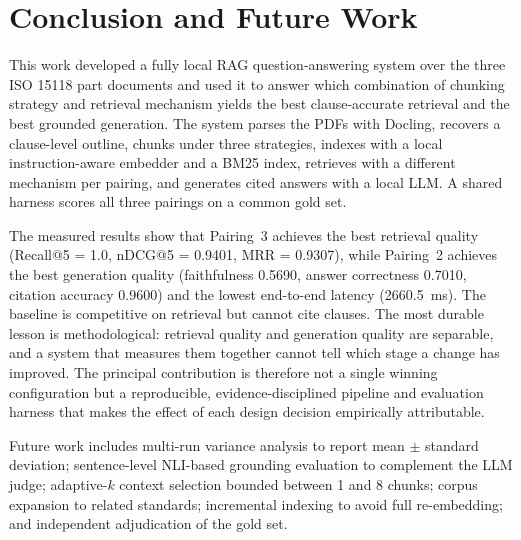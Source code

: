 \documentclass[conference]{IEEEtran}
\begin{document}
\section{Conclusion and Future Work}
This work developed a fully local RAG question-answering system over the three ISO 15118 part documents and used it to answer which combination of chunking strategy and retrieval mechanism yields the best clause-accurate retrieval and the best grounded generation. The system parses the PDFs with Docling, recovers a clause-level outline, chunks under three strategies, indexes with a local instruction-aware embedder and a BM25 index, retrieves with a different mechanism per pairing, and generates cited answers with a local LLM. A shared harness scores all three pairings on a common gold set.

The measured results show that Pairing~3 achieves the best retrieval quality (Recall@5 = 1.0, nDCG@5 = 0.9401, MRR = 0.9307), while Pairing~2 achieves the best generation quality (faithfulness 0.5690, answer correctness 0.7010, citation accuracy 0.9600) and the lowest end-to-end latency (2660.5~ms). The baseline is competitive on retrieval but cannot cite clauses. The most durable lesson is methodological: retrieval quality and generation quality are separable, and a system that measures them together cannot tell which stage a change has improved. The principal contribution is therefore not a single winning configuration but a reproducible, evidence-disciplined pipeline and evaluation harness that makes the effect of each design decision empirically attributable.

Future work includes multi-run variance analysis to report mean $\pm$ standard deviation; sentence-level NLI-based grounding evaluation to complement the LLM judge; adaptive-$k$ context selection bounded between 1 and 8 chunks; corpus expansion to related standards; incremental indexing to avoid full re-embedding; and independent adjudication of the gold set.
\end{document}
